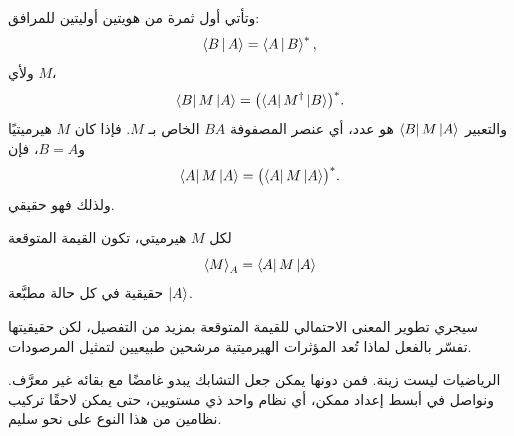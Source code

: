 وتأتي أول ثمرة من هويتين أوليتين للمرافق:
\begin{equation}
  \left\langle B\,\middle|\,A\right\rangle=\left\langle A\,\middle|\,B\right\rangle^*,
  \label{eq:l03-inner-conjugation}
\end{equation}
ولأي \(M\)،
\begin{equation}
  \left\langle B\right\rvert M\left\lvert A\right\rangle
  =
  \bigl(\left\langle A\right\rvert M^\dagger\left\lvert B\right\rangle\bigr)^*.
  \label{eq:l03-matrix-element-conjugation}
\end{equation}
والتعبير \(\left\langle B\right\rvert M\left\lvert A\right\rangle\) هو عدد، أي عنصر المصفوفة \(BA\) الخاص بـ \(M\). فإذا كان \(M\) هيرميتيًا و\(B=A\)، فإن
\begin{equation}
  \left\langle A\right\rvert M\left\lvert A\right\rangle
  =
  \bigl(\left\langle A\right\rvert M\left\lvert A\right\rangle\bigr)^*.
\end{equation}
ولذلك فهو حقيقي.

\begin{proposition}
لكل \(M\) هيرميتي، تكون القيمة المتوقعة
\begin{equation}
  \left\langle M\right\rangle_A=\left\langle A\right\rvert M\left\lvert A\right\rangle
  \label{eq:l03-expectation}
\end{equation}
حقيقية في كل حالة مطبَّعة \(\left\lvert A\right\rangle\).
\end{proposition}

سيجري تطوير المعنى الاحتمالي للقيمة المتوقعة بمزيد من التفصيل، لكن حقيقيتها تفسّر بالفعل لماذا تُعد المؤثرات الهيرميتية مرشحين طبيعيين لتمثيل المرصودات.

\begin{classroomqa}
\end{classroomqa}

\begin{classroomqa}
\end{classroomqa}

الرياضيات ليست زينة. فمن دونها يمكن جعل التشابك يبدو غامضًا مع بقائه غير معرَّف. ونواصل في أبسط إعداد ممكن، أي نظام واحد ذي مستويين، حتى يمكن لاحقًا تركيب نظامين من هذا النوع على نحو سليم.

